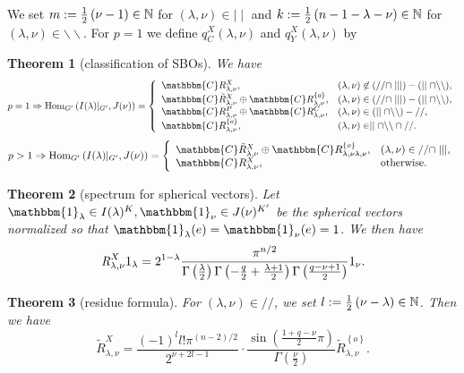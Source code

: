 \documentclass[12pt]{article} %
\newcommand{\nin}{\not\in}
\newcommand{\tmop}[1]{\ensuremath{\operatorname{#1}}}
\newtheorem{theorem}{Theorem}
\newcommand{\Hom}{\mbox{\normalfont Hom}}
\theoremstyle{definition}
\theoremstyle{exampstyle} \newtheorem{examp}[theorem]{Theorem}
\newcommand{\OpR}{\mbox{\it R}}
\newcommand{\IlambdaGprime}{I(\lambda)\kern-0.3em\mid_{G'}}
\newcommand{\SBO}{\Hom_{G'}\left(\IlambdaGprime,J(\nu) \right)}
\newcommand{\mm}{\mid\mid}
\newcommand{\bb}{\backslash\backslash}
\begin{document}
We set $m:=\frac{1}{2}\left( \nu-1 \right)\in\mathbb{N}$ for $(\lambda,\nu)\in\mm$ and $k:=\frac{1}{2}\left( n-1-\lambda-\nu \right)\in\mathbb{N}$ for $(\lambda,\nu)\in\bb$.
For $p=1$ we define $q_C^X(\lambda,\nu)$ and $q_Y^X(\lambda,\nu)$ by
\vspace{-3ex}
\begin{theorem}[classification of SBOs]
  We have\vspace{-1.5ex}
\[ p = 1 \Rightarrow \SBO = \left\{
   \begin{array}{ll}
     \mathbbm{C}R^X_{\lambda, \nu}, & (\lambda, \nu) \nin (/ /
     \cap \mid \mid \mid) - (\mid \mid \cap \backslash\backslash),\\
     \mathbbm{C} \tilde{R}^X_{\lambda, \nu} \oplus \mathbbm{C}R^{\{ o
     \}}_{\lambda, \nu}, & (\lambda, \nu) \in (/ / \cap \mid \mid \mid) -
     (\mid \mid \cap \backslash\backslash),\\
     \mathbbm{C}R^P_{\lambda, \nu} \oplus \mathbbm{C}R^C_{\lambda, \nu}, &
     (\lambda, \nu) \in (\mid \mid \cap \backslash\backslash) - / /,\\
     \mathbbm{C}R^{\{ o \}}_{\lambda, \nu}, & (\lambda, \nu) \in \mid \mid
     \cap \backslash\backslash \cap / /.
   \end{array} \right. \]
\[ p > 1 \Rightarrow \SBO = \left\{
   \begin{array}{ll}
     \mathbbm{C} \tilde{R}^X_{\lambda, \nu} \oplus \mathbbm{C}R^{\{ o
     \}}_{\lambda, \nu \lambda, \nu}, & (\lambda, \nu) \in / / \cap \mid \mid
     \mid,\\
     \mathbbm{C}R^X_{\lambda, \nu}, & \tmop{otherwise.}
   \end{array} \right. \]
\end{theorem}
\vspace{-2ex}
\begin{theorem}[spectrum for spherical vectors]
Let $\mathbbm{1}_\lambda\in I(\lambda)^K,\mathbbm{1}_\nu\in J(\nu)^{K'}$ be the spherical vectors normalized so that $\mathbbm{1}_\lambda(e)=\mathbbm{1}_\nu(e)=1$. We then have\vspace{-3.0ex}
	\[ \OpR^X_{\lambda, \nu} 1_{\lambda} = 2^{1 -
     \lambda} \frac{\pi^{n / 2}}{\Gamma \left( \frac{\lambda}{2} \right)
     \Gamma \left( - \frac{q}{2} + \frac{\lambda + 1}{2} \right) \Gamma \left(
     \frac{q - \nu + 1}{2} \right)} 1_{\nu}.\]
\end{theorem}
\vspace{-2ex}
\begin{theorem}[residue formula]
	For $(\lambda,\nu)\in//$, we set $l:=\frac{1}{2}\left( \nu-\lambda \right)\in\mathbb{N}$. Then we have
  \[\tilde{R}_{\lambda,\nu}^X  = \frac{ (- 1)^l l!\pi^{(n - 2) / 2} 
		}{2^{ \nu + 2 l-1}}\cdot  \frac{\sin\left( \frac{1+q-\nu}{2}\pi \right)}{\Gamma\left( \frac{\nu}{2} \right)}
	\tilde{R}_{\lambda,\nu}^{ \left\{ o \right\} }.\]
	\end{theorem}
\end{document}
